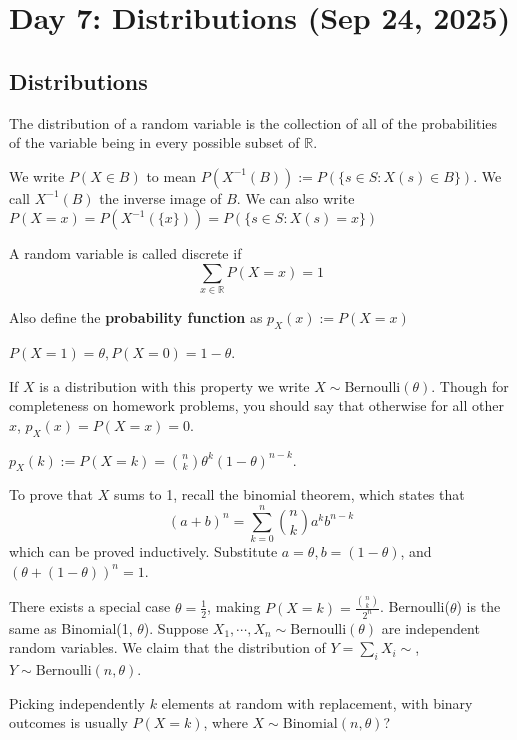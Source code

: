 \section{Day 7: Distributions (Sep 24, 2025)}

\subsection{Distributions}

\begin{definition}[Distribution]
The distribution of a random variable is the collection of all of the probabilities of the variable being in every possible subset of $\mathbb{R}$.
\end{definition}

We write $P(X \in B)$ to mean $P(X^{-1}(B)) := P(\{ s \in S: X(s) \in B \})$. We call $X^{-1}(B)$ the inverse image of $B$. We can also write $P(X = x) = P(X^{-1}(\{ x \})) = P(\{s \in S : X(s) = x\})$

\begin{definition}
A random variable is called discrete if
\[
    \sum_{x \in \mathbb{R}} P(X = x) = 1
\]
\end{definition}

\noindent Also define the \textbf{probability function} as $p_X(x) := P(X = x)$

\begin{definition}
    $P(X = 1) = \theta, P(X = 0) = 1 - \theta$.
\end{definition}
If $X$ is a distribution with this property we write $X \sim \text{Bernoulli}(\theta)$. Though for completeness on homework problems, you should say that otherwise for all other $x$, $p_X(x) = P(X = x) = 0$.

\begin{definition}
    $p_X(k) := P(X = k) = \binom{n}{k} \theta^k (1 - \theta)^{n-k}$.
\end{definition}

To prove that $X$ sums to 1, recall the binomial theorem, which states that
\[
(a + b)^n = \sum_{k = 0}^n \binom{n}{k} a^kb^{n-k} 
\]
which can be proved inductively. Substitute $a = \theta, b = (1 - \theta)$, and $(\theta + (1 - \theta))^n = 1$.

There exists a special case $\theta = \frac{1}{2}$, making $P(X = k) = \frac{\binom{n}{k}}{2^{n}}$. Bernoulli($\theta$) is the same as Binomial(1, $\theta$). Suppose $X_1, \cdots, X_n \sim \text{Bernoulli}(\theta)$ are independent random variables. We claim that the distribution of $Y = \sum_i X_i \sim$, $Y \sim \text{Bernoulli}(n, \theta)$.

Picking independently $k$ elements at random with replacement, with binary outcomes is usually $P(X = k)$, where $X \sim \text{Binomial}(n, \theta)$? 
